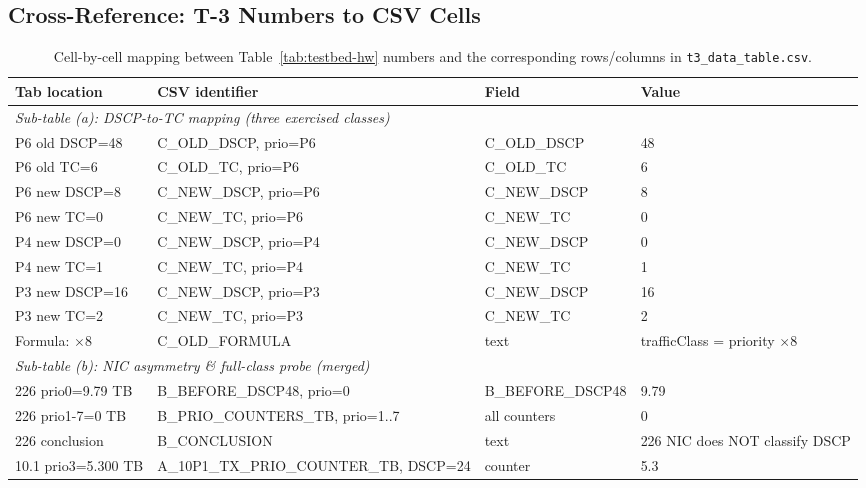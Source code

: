 \subsection*{Cross-Reference: T-3 Numbers to CSV Cells}
\label{tab:t3-crossref}

\begin{table}[htbp]
\centering
\caption{Cell-by-cell mapping between Table~\ref{tab:testbed-hw} numbers and
the corresponding rows/columns in \texttt{t3\_data\_table.csv}.}
\label{tab:t3-crossref-table}
\footnotesize
\begin{tabular}{llll}
\toprule
\textbf{Tab location} & \textbf{CSV identifier} & \textbf{Field} & \textbf{Value}\\
\midrule
\multicolumn{4}{l}{\textit{Sub-table (a): DSCP-to-TC mapping (three exercised classes)}} \\
P6 old DSCP=48 & C\_OLD\_DSCP, prio=P6 & C\_OLD\_DSCP & 48\\
P6 old TC=6 & C\_OLD\_TC, prio=P6 & C\_OLD\_TC & 6\\
P6 new DSCP=8 & C\_NEW\_DSCP, prio=P6 & C\_NEW\_DSCP & 8\\
P6 new TC=0 & C\_NEW\_TC, prio=P6 & C\_NEW\_TC & 0\\
P4 new DSCP=0 & C\_NEW\_DSCP, prio=P4 & C\_NEW\_DSCP & 0\\
P4 new TC=1 & C\_NEW\_TC, prio=P4 & C\_NEW\_TC & 1\\
P3 new DSCP=16 & C\_NEW\_DSCP, prio=P3 & C\_NEW\_DSCP & 16\\
P3 new TC=2 & C\_NEW\_TC, prio=P3 & C\_NEW\_TC & 2\\
Formula: $\times 8$ & C\_OLD\_FORMULA & text & trafficClass = priority $\times 8$\\
\midrule
\multicolumn{4}{l}{\textit{Sub-table (b): NIC asymmetry \& full-class probe (merged)}} \\
226 prio0=9.79 TB & B\_BEFORE\_DSCP48, prio=0 & B\_BEFORE\_DSCP48 & 9.79\\
226 prio1-7=0 TB & B\_PRIO\_COUNTERS\_TB, prio=1..7 & all counters & 0\\
226 conclusion & B\_CONCLUSION & text & 226 NIC does NOT classify DSCP \\
10.1 prio3=5.300 TB & A\_10P1\_TX\_PRIO\_COUNTER\_TB, DSCP=24 & counter & 5.3\\

\end{tabular}
\end{table}
